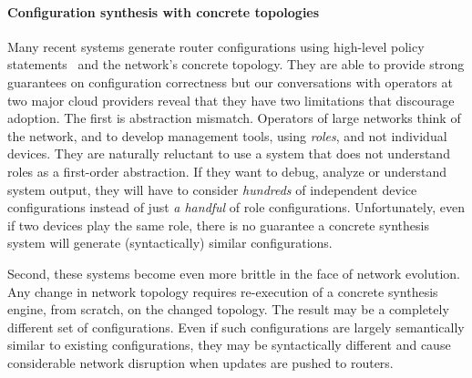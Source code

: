\documentclass{sig-alternate-10pt}
\newcommand{\para}[1]{\paragraph*{\textbf{#1}}}
\begin{document}
\para{Configuration synthesis with concrete topologies}
Many recent systems generate router configurations using high-level policy statements~\cite{narain:lisa05,narain+:configassure,dadc,propane} and the network's concrete topology.
They are able to provide strong guarantees on configuration correctness but 
our conversations with operators at two major cloud providers reveal that they have two limitations that discourage adoption.  The first is abstraction mismatch. Operators of large networks think of the network, and to develop management tools, using \emph{roles}, and not individual devices. They are naturally reluctant to use a system that does not
understand roles as a first-order abstraction. If they want to debug, analyze or
understand system output, they will have to consider
\emph{hundreds} of independent device configurations instead of just
\emph{a handful} of role configurations. Unfortunately, even if two devices play the same role,
there is no guarantee a concrete synthesis system will generate (syntactically) similar configurations.


Second, these systems become even more brittle in the face of network evolution.
Any change in network topology requires re-execution of a
concrete synthesis engine, from scratch,
on the changed topology.  The result may be
a completely different set of configurations.  Even if such configurations are
largely semantically similar to existing configurations, they may be syntactically different and cause considerable network disruption when updates are pushed to routers.
\end{document}
